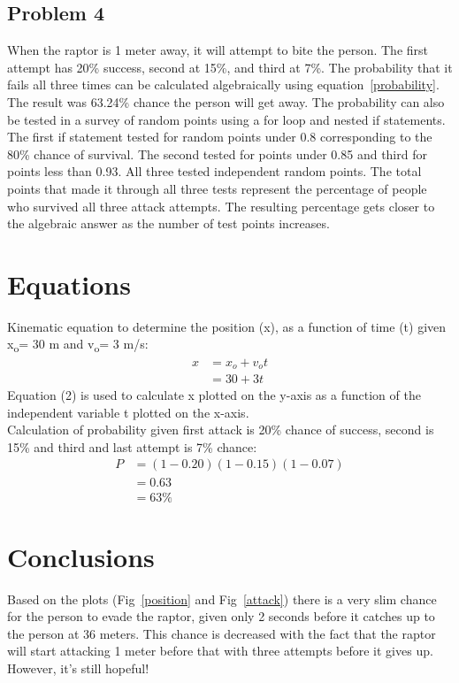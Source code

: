 \documentclass[twocolumn]{revtex4}
\begin{document}
\subsection{Problem 4}
When the raptor is 1 meter away, it will attempt to bite the person. The first attempt has 20\% success, second at 15\%, and third at 7\%. The probability that it fails all three times can be calculated algebraically using equation~\ref{probability}. The result was 63.24\% chance the person will get away. The probability can also be tested in a survey of random points using a for loop and nested if statements. The first if statement tested for random points under 0.8 corresponding to the 80\% chance of survival. The second tested for points under 0.85 and third for points less than 0.93. All three tested independent random points. The total points that made it through all three tests represent the percentage of people who survived all three attack attempts. The resulting percentage gets closer to the algebraic answer as the number of test points increases. 


\section{Equations}
Kinematic equation to determine the position (x), as a function of time (t) given x\textsubscript{o}= 30 m and v\textsubscript{o}= 3 m/s:
\begin{eqnarray}
\label{positioneqn}
x&=x_o+v_ot \\
&= 30+3t 
\end{eqnarray}
Equation (2) is used to calculate x plotted on the y-axis as a function of the independent variable t plotted on the x-axis.\\
Calculation of probability given first attack is 20\% chance of success, second is 15\% and third and last attempt is 7\% chance:
\begin{eqnarray}
\label{probability}
P &= (1-0.20)(1-0.15)(1-0.07) \\
&= 0.63 \\
&= 63\%
\end{eqnarray}
\section{Conclusions}
	Based on the plots (Fig~\ref{position} and Fig~\ref{attack}) there is a very slim chance for the person to evade the raptor, given only 2 seconds before it catches up to the person at 36 meters. This chance is decreased with the fact that the raptor will start attacking 1 meter before that with three attempts before it gives up. However, it's still hopeful!
\end{document}
